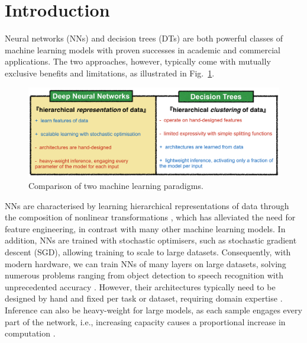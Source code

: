 \section{Introduction}
Neural networks (NNs) and decision trees (DTs) are both powerful classes of machine learning models with proven successes in academic and commercial applications. The two approaches, however, typically come with mutually exclusive benefits and limitations, as illustrated in Fig.~\ref{fig:pros_and_cons}.

\begin{figure}[ht]
	\center
	\includegraphics[width=0.85\linewidth]{chapter_7/figures/pros_and_cons.png}
	\caption{\small Comparison of two machine learning paradigms. }
	\label{fig:pros_and_cons}
\end{figure}

NNs are characterised by learning hierarchical representations of data through the composition of nonlinear transformations \cite{zeiler2014visualizing,bengio2013deep}, %
which has alleviated the need for feature engineering, in contrast with many other machine learning models. In addition, NNs are trained with stochastic optimisers, such as stochastic gradient descent (SGD), allowing training to scale to large datasets. Consequently, with modern hardware, we can train NNs of many layers on large datasets, solving numerous problems ranging from object detection to speech recognition with unprecedented accuracy \cite{lecun2015deep}. However, their architectures typically need to be designed by hand and fixed per task or dataset, requiring domain expertise \cite{zoph2016neural}. Inference can also be heavy-weight for large models, as each sample engages every part of the network, i.e., increasing capacity causes a proportional increase in computation \cite{bengio2013estimating}. 

